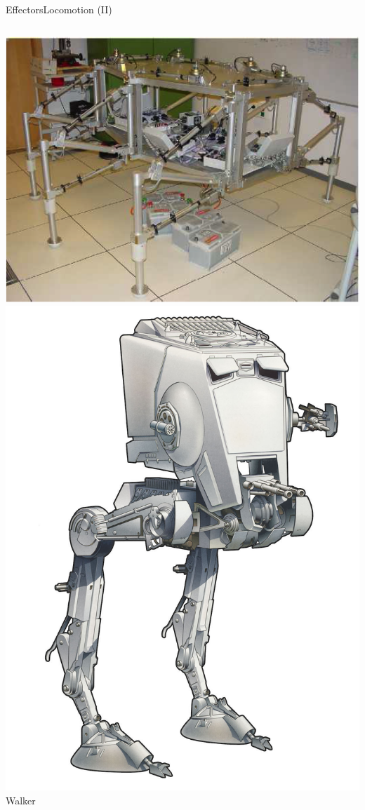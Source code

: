 \documentclass[10pt,compress]{beamer} %
\begin{document}
\begin{frame}{Effectors}{Locomotion (II)}
\begin{columns}
		\centering \includegraphics[width=\linewidth]{figs/ptinto.png}\\
		\centering \includegraphics[width=0.9\linewidth]{figs/at-st.jpg}\\Walker

\end{columns}
\end{frame}
\end{document}
